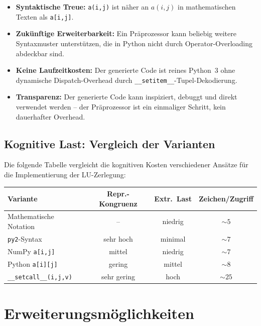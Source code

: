 \documentclass[a4paper,12pt]{article}
\theoremstyle{definition}
\begin{document}
\begin{itemize}
	\item \textbf{Syntaktische Treue:} \texttt{a(i,j)} ist näher an $a(i,j)$ in
	      mathematischen Texten als \texttt{a[i,j]}.
	\item \textbf{Zuk\"unftige Erweiterbarkeit:} Ein Pr\"aprozessor kann beliebig
	      weitere Syntaxmuster unterst\"utzen, die in Python nicht durch
	      Operator-Overloading abdeckbar sind.
	\item \textbf{Keine Laufzeitkosten:} Der generierte Code ist reines Python~3
	      ohne dynamische Dispatch-Overhead durch \texttt{\_\_setitem\_\_}-Tupel-Dekodierung.
	\item \textbf{Transparenz:} Der generierte Code kann inspiziert, debuggt und
	      direkt verwendet werden -- der Pr\"aprozessor ist ein einmaliger Schritt,
	      kein dauerhafter Overhead.
\end{itemize}

\subsection{Kognitive Last: Vergleich der Varianten}

Die folgende Tabelle vergleicht die kognitiven Kosten verschiedener Ans\"atze f\"ur
die Implementierung der LU-Zerlegung:

\begin{center}
\begin{tabular}{lccc}
\toprule
\textbf{Variante} & \textbf{Repr.-Kongruenz} & \textbf{Extr.\ Last} & \textbf{Zeichen/Zugriff} \\
\midrule
Mathematische Notation & -- & niedrig & $\sim 5$ \\
\texttt{py2}-Syntax & sehr hoch & minimal & $\sim 7$ \\
NumPy \texttt{a[i,j]} & mittel & niedrig & $\sim 7$ \\
Python \texttt{a[i][j]} & gering & mittel & $\sim 8$ \\
\texttt{\_\_setcall\_\_(i,j,v)} & sehr gering & hoch & $\sim 25$ \\
\bottomrule
\end{tabular}
\end{center}

\section{Erweiterungsm\"oglichkeiten}
\end{document}
